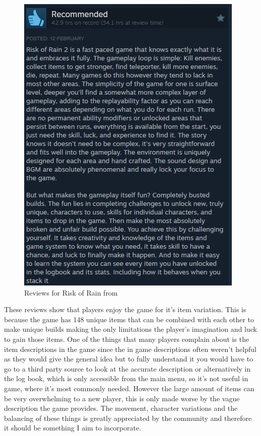 \documentclass{article}
\begin{document}
\begin{figure}[h]
\begin{minipage}{0.4\linewidth}
\includegraphics[width =\linewidth]{ROR2 review 2}
\end{minipage}

\caption{Reviews for Risk of Rain from \cite{ROR2ss}}
\label{ROR2 reviews}
\end{figure}

These reviews show that players enjoy the game for it's item variation. This is because the game has 148 unique items that can be combined with each other to make unique builds making the only limitations the player's imagination and luck to gain those items.
One of the things that many players complain about is the item descriptions in the game since the in game descriptions often weren't helpful as they would give the general idea but to fully understand it you would have to go to a third party source to look at the accurate description or alternatively in the log book, which is only accessible from the main menu, so it's not useful in game, where it's most commonly needed. However the large amount of items can be very overwhelming to a new player, this is only made worse by the vague description the game provides. The movement, character variations and the balancing of these things is greatly appreciated by the community and therefore it should be something I aim to incorporate.
\end{document}
